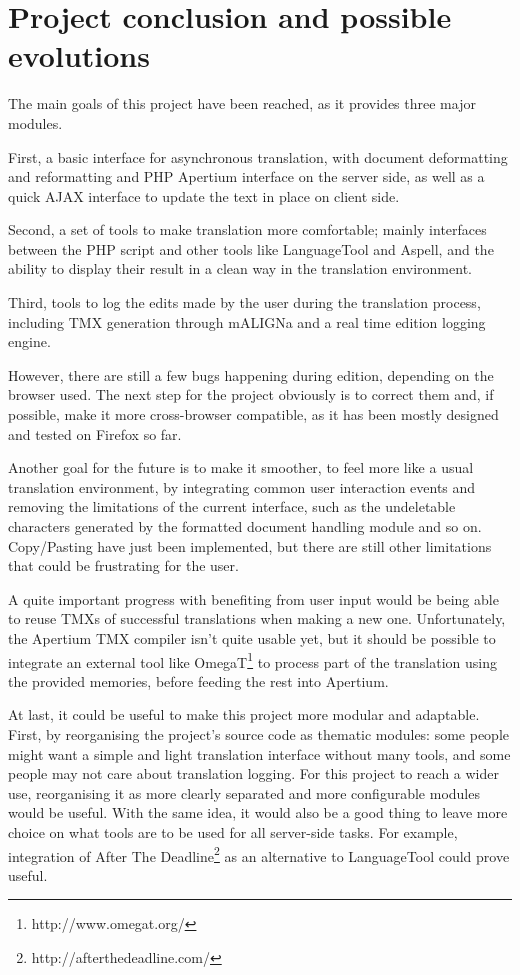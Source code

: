 \documentclass[11pt]{article}
\begin{document}
\section{Project conclusion and possible evolutions}

The main goals of this project have been reached, as it provides three 
major modules.

First, a basic interface for asynchronous translation, with document 
deformatting and reformatting and PHP Apertium interface on the server 
side, as well as a quick AJAX interface to update the text in place on 
client side.

Second, a set of tools to make translation more comfortable; mainly 
interfaces between the PHP script and other tools like LanguageTool and 
Aspell, and the ability to display their result in a clean way in the 
translation environment.

Third, tools to log the edits made by the user during the translation 
process, including TMX generation through mALIGNa and a real time edition 
logging engine.

\vspace{10pt}

However, there are still a few bugs happening during edition, depending 
on the browser used. 
The next step for the project obviously is to correct them and, if 
possible, make it more cross-browser compatible, as it has been mostly 
designed and tested on Firefox so far.

Another goal for the future is to make it smoother, to feel more like a 
usual translation environment, by integrating common user interaction 
events and removing the limitations of the current interface, such as 
the undeletable characters generated by the formatted document handling 
module and so on. 
Copy/Pasting have just been implemented, but there are still other 
limitations that could be frustrating for the user.

A quite important progress with benefiting from user input would be being 
able to reuse TMXs of successful translations when making a new one. 
Unfortunately, the Apertium TMX compiler isn't quite usable yet, but it 
should be possible to integrate an external tool like 
OmegaT\footnote{http://www.omegat.org/} to process part of the translation 
using the provided memories, before feeding the rest into Apertium.

At last, it could be useful to make this project more modular and 
adaptable. 
First, by reorganising the project’s source code as thematic modules: 
some people might want a simple and light translation interface 
without many tools, and some people may not care about translation 
logging. 
For this project to reach a wider use, reorganising it as more clearly 
separated and more configurable modules would be useful.
With the same idea, it would also be a good thing to leave more choice 
on what tools are to be used for all server-side tasks. 
For example, integration of After The 
Deadline\footnote{http://afterthedeadline.com/} as an alternative to 
LanguageTool could prove useful.
\end{document}
